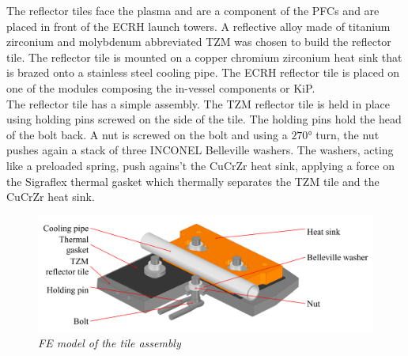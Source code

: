 \normalsize{\indent The reflector tiles face the plasma and are a component of the \acrshort{PFCs} and are placed in front of the \acrshort{ECRH} launch towers. A reflective alloy made of titanium zirconium and molybdenum abbreviated \acrshort{TZM} was chosen to build the reflector tile. The reflector tile is mounted on a copper chromium zirconium heat sink that is brazed onto a stainless steel cooling pipe. The \acrshort{ECRH} reflector tile is placed on one of the modules composing the in-vessel components or \acrshort{KiP}.}
\\
\break
\normalsize{\indent The reflector tile has a simple assembly. The \acrshort{TZM} reflector tile is held in place using holding pins screwed on the side of the tile. The holding pins hold the head of the bolt back. A nut is screwed on the bolt and using a $270 \si{\degree}$ turn, the nut pushes again a stack of three INCONEL Belleville washers. The washers, acting like a preloaded spring, push agains't the \acrshort{CuCrZr} heat sink, applying a force on the \acrshort{Sigraflex} thermal gasket which thermally separates the \acrshort{TZM} tile and the \acrshort{CuCrZr} heat sink.}
\begin{figure}[h!]
    \centering
    \includegraphics[width=1\textwidth]{figures/montage2.png}
    \caption{\it FE model of the tile assembly \cite{Fellinger_2013}}
    \label{fig:fig_3_2}
\end{figure}

